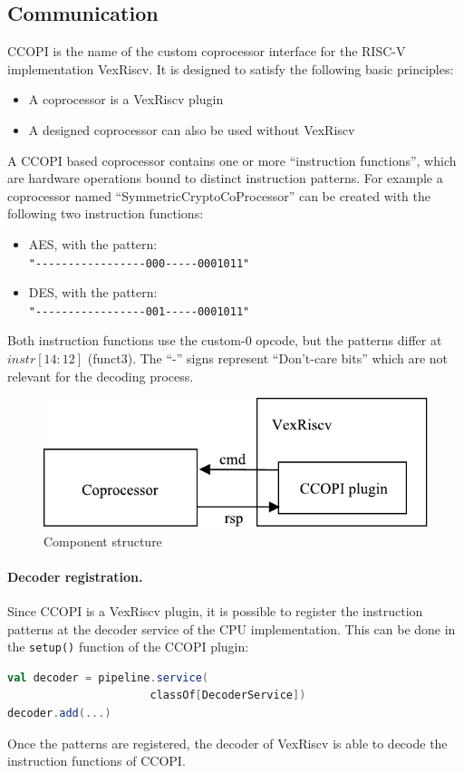\documentclass[twoside,twocolumn]{article}
\newcommand{\code}[1]{\texttt{#1}}
\begin{document}
\subsection{Communication}
\label{sec:ccopi-communication}
CCOPI is the name of the custom coprocessor interface for the RISC-V
implementation VexRiscv. It is designed to satisfy the following basic
principles:
\begin{itemize}
    \item A coprocessor is a VexRiscv plugin
    \item A designed coprocessor can also be used without VexRiscv
\end{itemize}
A CCOPI based coprocessor contains one or more ``instruction
functions'', which are hardware operations bound to distinct
instruction patterns. For example a coprocessor named
``SymmetricCryptoCoProcessor'' can be created with the following two
instruction functions:
\begin{itemize}
    \item AES, with the pattern:\\ \code{"-{}-{}-{}-{}-{}-{}-{}-{}-{}-{}-{}-{}-{}-{}-{}-{}-{}000-{}-{}-{}-{}-{}0001011"} 
    \item DES, with the pattern: \\ \code{"-{}-{}-{}-{}-{}-{}-{}-{}-{}-{}-{}-{}-{}-{}-{}-{}-{}001-{}-{}-{}-{}-{}0001011"}
\end{itemize}
Both instruction functions use the custom-0 opcode, but the patterns
differ at $instr[14:12]$ (funct3). The ``-'' signs represent ``Don't-care
bits'' which are not relevant for the decoding process.
\begin{figure}[h]
    \includegraphics[scale=0.68]{includes/ccopi_plugin}
    \caption{Component structure}
    \label{fig:component_structure}
\end{figure}
\paragraph{Decoder registration.} Since CCOPI is a VexRiscv plugin,
it is possible to register the
instruction patterns at the decoder service of the CPU implementation.
This can be done in the \code{setup()} function of the CCOPI plugin:
\begin{lstlisting}[language=scala]
val decoder = pipeline.service(
                      classOf[DecoderService])
decoder.add(...)
\end{lstlisting}
Once the patterns are registered, the decoder of VexRiscv is able to
decode the instruction functions of CCOPI.
\end{document}
